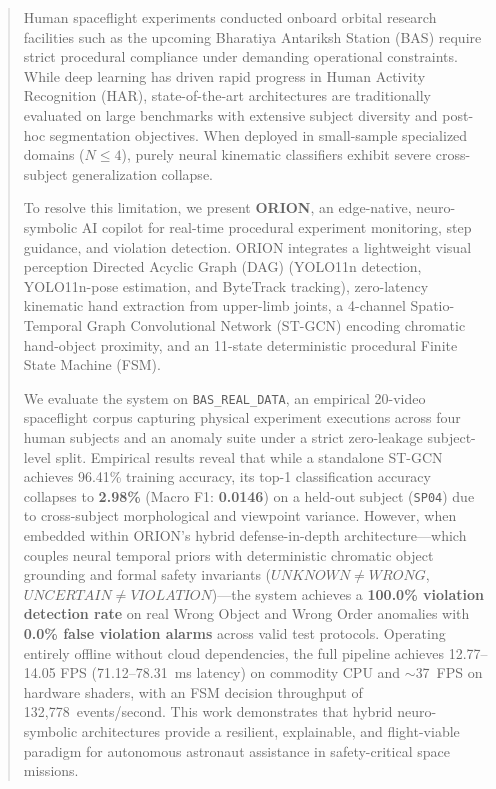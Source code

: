 \documentclass[journal,twocolumn]{IEEEtran}
\begin{document}
\begin{abstract}
Human spaceflight experiments conducted onboard orbital research facilities such as the upcoming Bharatiya Antariksh Station (BAS) require strict procedural compliance under demanding operational constraints. While deep learning has driven rapid progress in Human Activity Recognition (HAR), state-of-the-art architectures are traditionally evaluated on large benchmarks with extensive subject diversity and post-hoc segmentation objectives. When deployed in small-sample specialized domains ($N \le 4$), purely neural kinematic classifiers exhibit severe cross-subject generalization collapse. 

To resolve this limitation, we present \textbf{ORION}, an edge-native, neuro-symbolic AI copilot for real-time procedural experiment monitoring, step guidance, and violation detection. ORION integrates a lightweight visual perception Directed Acyclic Graph (DAG) (YOLO11n detection, YOLO11n-pose estimation, and ByteTrack tracking), zero-latency kinematic hand extraction from upper-limb joints, a 4-channel Spatio-Temporal Graph Convolutional Network (ST-GCN) encoding chromatic hand-object proximity, and an 11-state deterministic procedural Finite State Machine (FSM). 

We evaluate the system on \texttt{BAS\_REAL\_DATA}, an empirical 20-video spaceflight corpus capturing physical experiment executions across four human subjects and an anomaly suite under a strict zero-leakage subject-level split. Empirical results reveal that while a standalone ST-GCN achieves 96.41\% training accuracy, its top-1 classification accuracy collapses to \textbf{2.98\%} (Macro F1: \textbf{0.0146}) on a held-out subject (\texttt{SP04}) due to cross-subject morphological and viewpoint variance. However, when embedded within ORION's hybrid defense-in-depth architecture---which couples neural temporal priors with deterministic chromatic object grounding and formal safety invariants ($UNKNOWN \ne WRONG$, $UNCERTAIN \ne VIOLATION$)---the system achieves a \textbf{100.0\% violation detection rate} on real Wrong Object and Wrong Order anomalies with \textbf{0.0\% false violation alarms} across valid test protocols. Operating entirely offline without cloud dependencies, the full pipeline achieves 12.77--14.05 FPS (71.12--78.31~ms latency) on commodity CPU and $\sim$37~FPS on hardware shaders, with an FSM decision throughput of 132,778~events/second. This work demonstrates that hybrid neuro-symbolic architectures provide a resilient, explainable, and flight-viable paradigm for autonomous astronaut assistance in safety-critical space missions.
\end{abstract}
\end{document}
